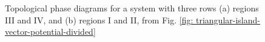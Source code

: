 \documentclass[aps,prb,showpacs,amsmath,twocolumn,amssymb,superscriptaddress]{revtex4-2}
\begin{document}
\begin{figure}[]
  \hfill
  \hfill
  \caption{Topological phase diagrams for a system with three rows (a) regions III and IV, and (b) regions I and II, from Fig. \ref{fig: triangular-island-vector-potential-divided}}
  \label{fig: majorana-number}
\end{figure}
\end{document}

